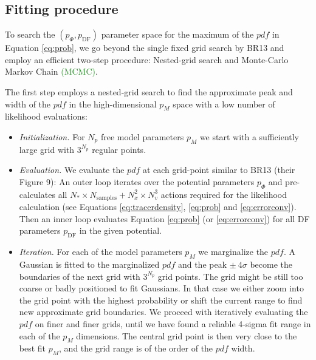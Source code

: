 \documentclass[iop,revtex4,numberedappendix,appendixfloats]{emulateapj}
\newcommand{\pdf}{\ensuremath{pdf}}
\newcommand{\pmodel}{\ensuremath{p_M}}
\newcommand{\NEW}[1]{\textcolor{ForestGreen}{#1}}
\begin{document}
\subsection{Fitting procedure} \label{sec:fitting}

To search the $(p_\Phi,p_\text{DF})$ parameter space for the maximum of the \pdf{} in Equation \eqref{eq:prob}, we go beyond the single fixed grid search by BR13 and employ an efficient two-step procedure: Nested-grid search and Monte-Carlo Markov Chain \NEW{(MCMC)}.

The first step employs a nested-grid search to find the approximate peak and width of the \pdf{} in the high-dimensional \pmodel{}  space with a low number of likelihood evaluations:

\begin{itemize}
\item \emph{Initialization.} For $N_p$ free model parameters \pmodel{} we start with a sufficiently large grid with $3^{N_p}$ regular points.

\item  \emph{Evaluation.} We evaluate the \pdf{} at each grid-point similar to BR13 (their Figure 9):  An outer loop iterates over the potential parameters $p_\Phi$ and pre-calculates all $N_* \times N_\text{samples} + N_x^2 \times N_v^3$ actions required for the likelihood calculation (see Equations \eqref{eq:tracerdensity}, \eqref{eq:prob} and \eqref{eq:errorconv}). Then an inner loop evaluates Equation \eqref{eq:prob} (or \eqref{eq:errorconv}) for all DF parameters $p_\text{DF}$ in the given potential.

\item \emph{Iteration.} For each of the model parameters \pmodel{} we marginalize the \pdf{}. A Gaussian is fitted to the marginalized \pdf{} and the peak $\pm ~ 4\sigma$ become the boundaries of the next grid with $3^{N_p}$ grid points. The grid might be still too coarse or badly positioned to fit Gaussians. In that case we either zoom into the grid point with the highest probability or shift the current range to find new approximate grid boundaries. We proceed with iteratively evaluating the \pdf{} on finer and finer grids, until we have found a reliable 4-sigma fit range in each of the \pmodel{} dimensions. The central grid point is then very close to the best fit \pmodel{}, and the grid range is of the order of the \pdf{} width.


\end{itemize}
\end{document}
